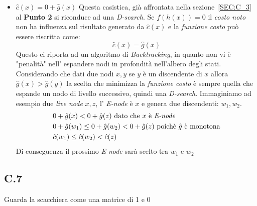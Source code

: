 \documentclass[a4paper]{article}
\begin{document}
\begin{itemize}
	\item $\hat c(x) = 0 + \hat g(x)$ Questa casistica, già affrontata nella sezione~\ref{SEC:C_3} al \textbf{Punto 2} si riconduce ad una \textit{D-search}.
		Se $f(h(x)) =0$ il \textit{costo noto} non ha influenza sul risultato generato da $\hat c(x)$ e la \textit{funzione costo} può essere riscritta come: $$\hat c(x) = \hat g(x)$$
Questo ci riporta ad un algoritmo di \textit{Backtracking}, in quanto non vi è "penalità" nell' espandere nodi in profondità nell'albero degli stati.
Considerando che dati due nodi $x,y$ se $y$ è un discendente di $x$ allora $\hat g(x) > \hat g(y)$ la scelta che minimizza la \textit{funzione costo} è sempre quella che espande un nodo di livello successivo, quindi una \textit{D-search}.
Immaginiamo ad esempio due \textit{live node} $x,z$, l' \textit{E-node} è $x$ e genera due discendenti: $w_1, w_2$.
                \begin{align}
                        &0 + \hat g(x) < 0 + \hat g(z) \text{ dato che $x$ è \textit{E-node}} \notag \\
                        &0 + \hat g(w_1) \leq 0 + \hat g(w_2) < 0 + \hat g(z) \text{ poichè $\hat g$ è monotona} \notag\\
                        &\hat c(w_1) \leq \hat c(w_2) < \hat c(z) \notag
                \end{align}
Di conseguenza il prossimo \textit{E-node} sarà scelto tra $w_1$ e $w_2$

\end{itemize}
\subsection{C.7}
Guarda la scacchiera come una matrice di 1 e 0
\end{document}
